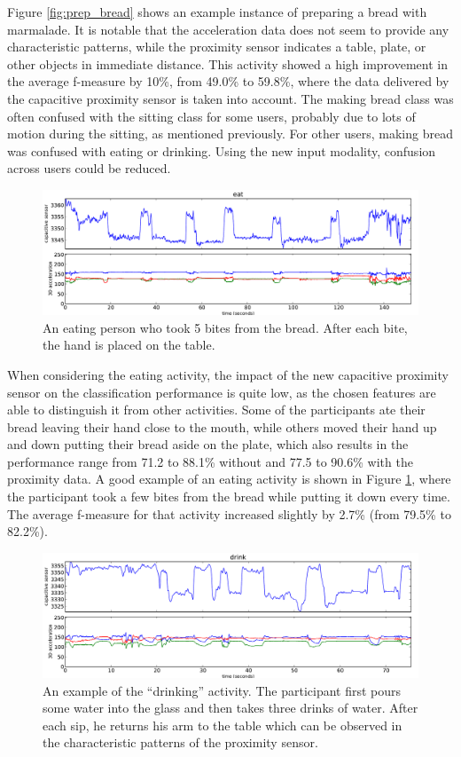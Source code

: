 \documentclass[runningheads,a4paper]{llncs}
\begin{document}
Figure \ref{fig:prep_bread} shows an example instance of preparing a bread with marmalade. It is notable that the acceleration data does not seem to provide any characteristic patterns, while the proximity sensor indicates a table, plate, or other objects in immediate distance. This activity showed a high improvement in the average f-measure by 10\%, from 49.0\% to 59.8\%, where the data delivered by the capacitive proximity sensor is taken into account. The making bread class was often confused with the sitting class for some users, probably due to lots of motion during the sitting, as mentioned previously. For other users, making bread was confused with eating or drinking. Using the new input modality, confusion across users could be reduced.

\begin{figure}
	\centering
		\includegraphics[width=\textwidth]{../Auswertung/images/eugen_6.pdf}
	\caption{An eating person who took 5 bites from the bread. After each bite, the hand is placed on the table.}
	\label{fig:eating}
\end{figure}

When considering the eating activity, the impact of the new capacitive proximity sensor on the classification performance is quite low, as the chosen features are able to distinguish it from other activities. Some of the participants ate their bread leaving their hand close to the mouth, while others moved their hand up and down putting their bread aside on the plate, which also results in the performance range from 71.2 to 88.1\% without and 77.5 to 90.6\% with the proximity data. A good example of an eating activity is shown in Figure \ref{fig:eating}, where the participant took a few bites from the bread while putting it down every time. The average f-measure for that activity increased slightly by 2.7\% (from 79.5\% to 82.2\%). 

\begin{figure}
	\centering
		\includegraphics[width=\textwidth]{../Auswertung/images/eugen_7.pdf}
	\caption{An example of the ``drinking'' activity. The participant first pours some water into the glass and then takes three drinks of water. After each sip, he returns his arm to the table which can be observed in the characteristic patterns of the proximity sensor.}
	\label{fig:drinking}
\end{figure}
\end{document}

